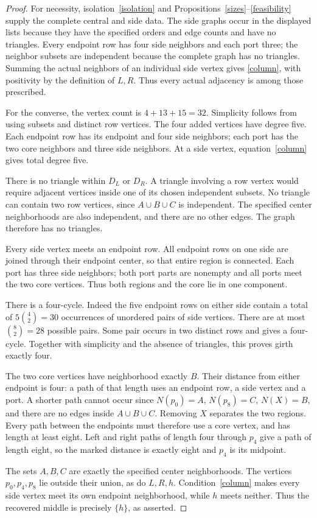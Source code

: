 \documentclass[11pt]{article}
\begin{document}
\begin{proof}
For necessity, isolation~\eqref{isolation} and
Propositions~\ref{sizes}--\ref{feasibility} supply the complete central
and side data. The side graphs occur in the displayed lists because
they have the specified orders and edge counts and have no triangles. Every endpoint
row has four side neighbors and each port three; the neighbor subsets
are independent because the complete graph has no triangles. Summing
the actual neighbors of an individual side vertex gives
\eqref{column}, with positivity by the definition of $L,R$. Thus every
actual adjacency is among those prescribed.

For the converse, the vertex count is $4+13+15=32$. Simplicity follows
from using subsets and distinct row vertices. The four added vertices have
degree five. Each endpoint row has its endpoint and four side neighbors;
each port has the two core neighbors and three side neighbors. At a side
vertex, equation~\eqref{column} gives total degree five.

There is no triangle within $D_L$ or $D_R$. A triangle involving a row
vertex would require adjacent vertices inside one of its chosen
independent subsets. No triangle can contain two row vertices, since
$A\cup B\cup C$ is independent. The specified center neighborhoods
are also independent, and there are no other edges. The graph therefore
has no triangles.

Every side vertex meets an endpoint row. All endpoint rows on one side
are joined through their endpoint center, so that entire region is
connected. Each port has three side neighbors; both port parts are
nonempty and all ports meet the two core vertices. Thus both regions
and the core lie in one component.

There is a four-cycle. Indeed the five endpoint rows on either side
contain a total of $5\binom42=30$ occurrences of unordered pairs of side
vertices. There are at most $\binom82=28$ possible pairs. Some pair
occurs in two distinct rows and gives a four-cycle. Together with
simplicity and the absence of triangles, this proves girth exactly four.

The two core vertices have neighborhood exactly $B$. Their distance
from either endpoint is four: a path of that length uses an endpoint
row, a side vertex and a port. A shorter path cannot occur since
$N(p_0)=A$, $N(p_8)=C$, $N(X)=B$, and there are no edges inside
$A\cup B\cup C$. Removing $X$ separates the two regions. Every path
between the endpoints must therefore use a core vertex, and has length
at least eight. Left and right paths of length four through $p_4$ give
a path of length eight, so the marked distance is exactly eight and
$p_4$ is its midpoint.

The sets $A,B,C$ are exactly the specified center neighborhoods. The
vertices $p_0,p_4,p_8$ lie outside their union, as do $L,R,h$.
Condition~\eqref{column} makes every side vertex meet its own endpoint
neighborhood, while $h$ meets neither. Thus the recovered middle is
precisely $\{h\}$, as asserted.
\end{proof}
\end{document}
